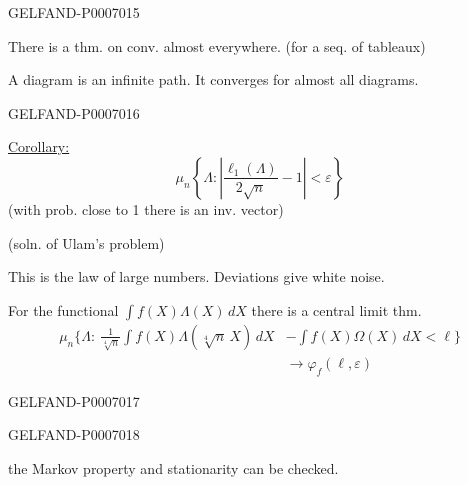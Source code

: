 \begin{GelfandAdjacentEvidence}{GELFAND-P000701}{5}

There is a thm. on conv. almost everywhere. (for a seq. of tableaux)

A diagram is an infinite path. It converges for almost all diagrams.
\end{GelfandAdjacentEvidence}
\begin{GelfandAdjacentEvidence}{GELFAND-P000701}{6}


\underline{Corollary:}
\[
\mu_n\left\{\Lambda:\left|\frac{\ell_1(\Lambda)}{2\sqrt n}-1\right|<\varepsilon\right\}
\]
(with prob. close to 1 there is an inv. vector)

(soln. of Ulam’s problem)

This is the law of large numbers. Deviations give white noise.

For the functional \(\int f(X)\Lambda(X)\,dX\) there is a central limit thm.
\[
\begin{aligned}
\mu_n\biggl\{\Lambda:\ \frac{1}{\sqrt[4]{n}}\int f(X)\Lambda(\sqrt[4]{n}\,X)\,dX
  &-\int f(X)\Omega(X)\,dX<\ell\biggr\}\\[-1pt]
  &\longrightarrow\varphi_f(\ell,\varepsilon)
\end{aligned}
\]
\end{GelfandAdjacentEvidence}
\begin{GelfandAdjacentEvidence}{GELFAND-P000701}{7}

\end{GelfandAdjacentEvidence}
\begin{GelfandAdjacentEvidence}{GELFAND-P000701}{8}


the Markov property and stationarity can be checked.

\end{GelfandAdjacentEvidence}
